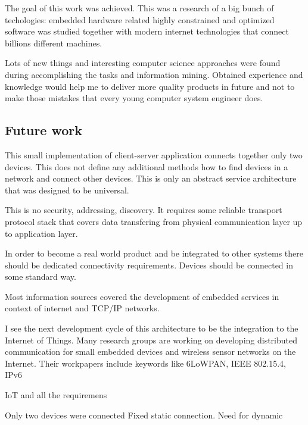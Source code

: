 The goal of this work was achieved.
This was a research of a big bunch of techologies: embedded hardware related
highly constrained and optimized software was studied together with  modern
internet technologies that connect billions different machines.

Lots of new things and interesting computer science approaches were found during 
accomplishing the tasks and information mining.
Obtained experience and knowledge would help me to
deliver more quality products in future and not to make those mistakes that
every young computer system engineer does.

\subsection{Future work}
This small implementation of client-server application connects together only
two devices. 
This does not define any additional methods how to find
devices in a network and connect other devices.
This is only an abstract service architecture that was designed to be universal.

This is no security, addressing, discovery. 
It requires some reliable transport protocol stack that covers data transfering
from physical communication layer up to application layer.

In order to become a real world product and be integrated to other systems 
there should be dedicated connectivity requirements.
Devices should be connected in some standard way. 

Most  information sources covered the development of embedded services in
context of internet and TCP/IP networks.

I see the next development cycle of this architecture to be the integration to
the Internet of Things.
Many research groups are working on developing distributed communication for
small embedded devices and wireless sensor networks on the Internet. 
Their workpapers include keywords like 6LoWPAN, IEEE 802.15.4, IPv6 

 IoT and all the requiremens

Only two devices were connected
Fixed static connection. Need for dynamic
